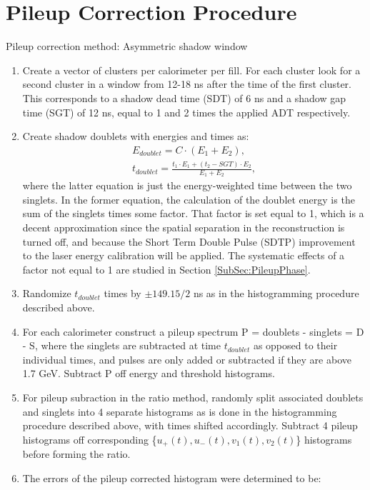\section{Pileup Correction Procedure}
\label{Sec:PileupCorrection}

	Pileup correction method: Asymmetric shadow window

	\begin{enumerate}
		\item{Create a vector of clusters per calorimeter per fill. For each cluster look for a second cluster in a window from 12-18 ns after the time of the first cluster. This corresponds to a shadow dead time (SDT) of 6 ns and a shadow gap time (SGT) of 12 ns, equal to 1 and 2 times the applied ADT respectively.}
		\item{Create shadow doublets with energies and times as:
			\begin{gather}
				E_{doublet} = C \cdot (E_{1} + E_{2}), \\
				t_{doublet} = \frac{t_{1} \cdot E_{1} + (t_{2}-SGT) \cdot E_{2}}{E_{1} + E_{2}},
			\end{gather}
		where the latter equation is just the energy-weighted time between the two singlets. In the former equation, the calculation of the doublet energy is the sum of the singlets times some factor. That factor is set equal to 1, which is a decent approximation since the spatial separation in the reconstruction is turned off, and because the Short Term Double Pulse (SDTP) improvement to the laser energy calibration will be applied. The systematic effects of a factor not equal to 1 are studied in Section \ref{SubSec:PileupPhase}.}
		\item{Randomize $t_{doublet}$ times by $\pm 149.15/2$ ns as in the histogramming procedure described above.}
		\item{For each calorimeter construct a pileup spectrum P = doublets - singlets = D - S, where the singlets are subtracted at time $t_{doublet}$ as opposed to their individual times, and pulses are only added or subtracted if they are above 1.7 GeV. Subtract P off energy and threshold histograms.}
		\item{For pileup subraction in the ratio method, randomly split associated doublets and singlets into 4 separate histograms as is done in the histogramming procedure described above, with times shifted accordingly. Subtract 4 pileup histograms off corresponding \{$u_{+}(t), u_{-}(t), v_{1}(t), v_{2}(t)$\} histograms before forming the ratio.}
		\item{The errors of the pileup corrected histogram were determined to be: 
}
\end{enumerate}
